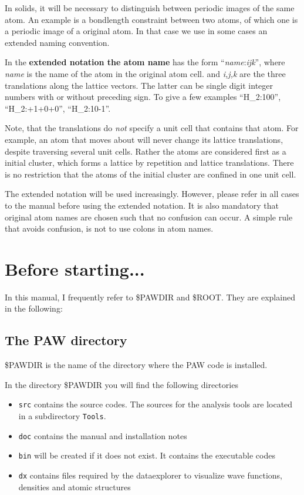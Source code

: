 \documentclass[final,12pt]{article}
\begin{document}
In solids, it will be necessary to distinguish between periodic images
of the same atom. An example is a bondlength constraint between two
atoms, of which one is a periodic image of a original atom. In that
case we use in some cases an extended naming convention.

In the \textbf{extended notation the atom name} has the form
``\textit{name}:\textit{ijk}'', where {\it name} is the name of the
atom in the original atom cell. and {\it i,j,k} are the three
translations along the lattice vectors. The latter can be single digit
integer numbers with or without preceding sign. To give a few
examples ``H\_2:100'', ``H\_2:+1+0+0'', ``H\_2:10-1''.

Note, that the translations do {\em not} specify a unit cell that
contains that atom. For example, an atom that moves about will never
change its lattice translations, despite traversing several unit
cells. Rather the atoms are considered first as a initial cluster, which forms
a lattice by repetition and lattice translations. There is no
restriction that the atoms of the initial cluster are confined in one
unit cell.

The extended notation will be used increasingly. However, please refer
in all cases to the manual before using the extended notation. It is
also mandatory that original atom names are chosen such that no
confusion can occur. A simple rule that avoids confusion, is not to
use colons in atom names.

\section{Before starting...}
In this manual, I frequently refer to \$PAWDIR and \$ROOT. They are explained in the following:

\subsection{The PAW directory}
\$PAWDIR is the name of the directory where the PAW code is
installed. 

In the directory \$PAWDIR you will find the following directories 
\begin{itemize}
\item \verb|src| contains the source codes. The sources for the
analysis tools are located in a subdirectory \verb|Tools|.
\item \verb|doc| contains the manual and installation notes
\item \verb|bin| will be created if it does not exist. It contains the
executable codes
\item \verb|dx| contains files required by the dataexplorer to
visualize wave functions, densities and atomic structures
\end{itemize}
\end{document}
